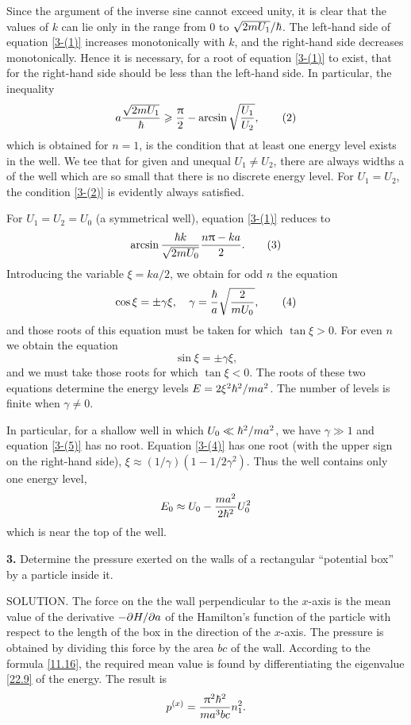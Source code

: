 {Since the argument of the inverse sine cannot exceed unity, it is clear that the values of $ k $ can lie only in the range from $ 0 $ to $ \sqrt{2mU_1}/\hbar $. The left-hand side of equation \eqref{3-(1)} increases monotonically with $ k $, and the right-hand side decreases monotonically. Hence it is necessary, for a root of equation \eqref{3-(1)} to exist, that for the right-hand side should be less than the left-hand side. In particular, the inequality
\begin{equation}\label{3-(2)}
a\frac{\sqrt{2mU_1}}{\hbar}\geqslant\frac{\uppi}{2}-\arcsin\sqrt{\frac{U_1}{U_2}},\tag{2}
\end{equation}
which is obtained for $ n = 1 $, is the condition that at least one energy level exists in the well. We tee that for given and unequal $ U_1 \ne U_2 $, there are always widths a of the well which are so small that there is no discrete energy level. For $ U_1 = U_2 $, the condition \eqref{3-(2)} is evidently always satisfied.

For $ U_1 = U_2 = U_0 $ (a symmetrical well), equation \eqref{3-(1)} reduces to
\begin{equation}\label{3-(3)}
\arcsin\frac{\hbar k}{\sqrt{2mU_0}}\frac{n\uppi-ka}{2}.\tag{3}
\end{equation}
Introducing the variable $ \xi=ka/2 $, we obtain for odd $ n $ the equation
\begin{equation}\label{3-(4)}
\cos\xi=\pm\gamma\xi,\quad\gamma=\frac{\hbar}{a}\sqrt{\frac{2}{mU_0}},\tag{4}
\end{equation}
and those roots of this equation must be taken for which $ \tan \xi > 0 $. For even $ n $ we obtain the equation
\begin{equation}\label{3-(5)}
\sin\xi=\pm\gamma\xi,\tag{5}
\end{equation}
and we must take those roots for which $ \tan \xi < 0 $. The roots of these two equations determine the energy levels $ E=2\xi^2\hbar^2/ma^2 $. The number of levels is finite when $ \gamma\ne0 $.

In particular, for a shallow well in which $ U_0\ll \hbar^2/ma^2 $, we have $ \gamma\gg 1 $ and equation \eqref{3-(5)} has no root. Equation \eqref{3-(4)} has one root (with the upper sign on the right-hand side), $ \xi\approx(1/\gamma)(1-1/2\gamma^2) $. Thus the well contains only one energy level,
\[ E_0\approx U_0-\frac{ma^2}{2\hbar^2}U_0^2 \]
which is near the top of the well.





\textbf{3.} Determine the pressure exerted on the walls of a rectangular “potential box” by a particle inside it.





SOLUTION. The force on the the wall perpendicular to the $ x $-axis is the mean value of the derivative $ -\partial H/\partial a $ of the Hamilton’s function of the particle with respect to the length of the box in the direction of the $ x $-axis. The pressure is obtained by dividing this force by the area $ bc $ of the wall. According to the formula \eqref{11.16}, the required mean value is found by differentiating the eigenvalue \eqref{22.9} of the energy. The result is
\[ p^{(x)}=\frac{\uppi^2\hbar^2}{ma^3bc}n_1^2. \]

}
